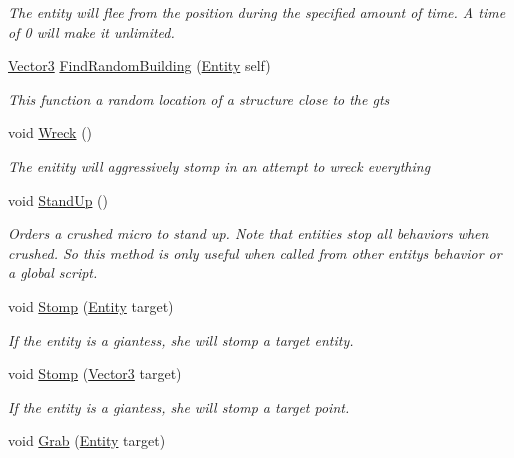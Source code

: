 \begin{DoxyCompactItemize}
\begin{DoxyCompactList}\small\item\em The entity will flee from the position during the specified amount of time. A time of 0 will make it unlimited. \end{DoxyCompactList}\item 
\mbox{\hyperlink{class_lua_1_1_vector3}{Vector3}} \mbox{\hyperlink{class_lua_1_1_entity_a72e0a626a062ba116cf62cfeb77f87f8}{Find\+Random\+Building}} (\mbox{\hyperlink{class_lua_1_1_entity}{Entity}} self)
\begin{DoxyCompactList}\small\item\em This function a random location of a structure close to the gts \end{DoxyCompactList}\item 
void \mbox{\hyperlink{class_lua_1_1_entity_a5690c11c287139f6d5b5171f5d4189e9}{Wreck}} ()
\begin{DoxyCompactList}\small\item\em The enitity will aggressively stomp in an attempt to wreck everything \end{DoxyCompactList}\item 
void \mbox{\hyperlink{class_lua_1_1_entity_af93c20b6cca387d60a5368c079ae65ef}{Stand\+Up}} ()
\begin{DoxyCompactList}\small\item\em Orders a crushed micro to stand up. Note that entities stop all behaviors when crushed. So this method is only useful when called from other entity\textquotesingle{}s behavior or a global script. \end{DoxyCompactList}\item 
void \mbox{\hyperlink{class_lua_1_1_entity_a0a8058c8b504215e492471b4e7d557d4}{Stomp}} (\mbox{\hyperlink{class_lua_1_1_entity}{Entity}} target)
\begin{DoxyCompactList}\small\item\em If the entity is a giantess, she will stomp a target entity. \end{DoxyCompactList}\item 
void \mbox{\hyperlink{class_lua_1_1_entity_ad6c8d1dc736aeea69e734d3c1e884343}{Stomp}} (\mbox{\hyperlink{class_lua_1_1_vector3}{Vector3}} target)
\begin{DoxyCompactList}\small\item\em If the entity is a giantess, she will stomp a target point. \end{DoxyCompactList}\item 
void \mbox{\hyperlink{class_lua_1_1_entity_a6ddff7e7a95c85ba34bee6b8b5c4ee93}{Grab}} (\mbox{\hyperlink{class_lua_1_1_entity}{Entity}} target)

\end{DoxyCompactItemize}
